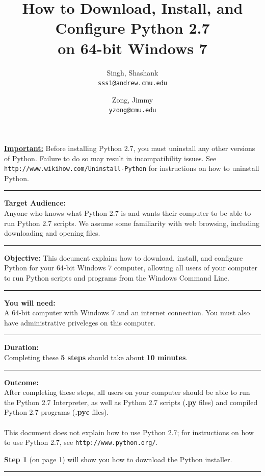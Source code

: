 \documentclass[11pt,english]{article}
\title{How to Download, Install, and Configure Python 2.7\\
on 64-bit Windows 7}
\author{
  Singh, Shashank \\
  \texttt{sss1@andrew.cmu.edu}
  \and
  Zong, Jimmy\\
  \texttt{yzong@cmu.edu}
}
\newcommand{\myhrule}{\vspace{0.3cm}\hrule\vspace{0.3cm}}
\begin{document}
\begin{titlepage}
\maketitle
\vfill
{\bf \color{red} \underline{Important:}} Before installing Python 2.7, you must
uninstall any other versions of Python. Failure to do so may result in
incompatibility issues. See \texttt{http://www.wikihow.com/Uninstall-Python}
for instructions on how to uninstall Python.
\myhrule
{\bf Target Audience:}\\
Anyone who knows what Python 2.7 is and wants their computer to be able to run
Python 2.7 scripts. We assume some familiarity with web browsing, including
downloading and opening files.
\myhrule
{\bf Objective:} This document explains how to download, install, and
configure Python for your 64-bit Windows 7 computer, allowing all users of your
computer to run Python scripts and programs from the Windows Command Line.
\myhrule
{\bf You will need:}\\
A 64-bit computer with Windows 7 and an internet connection. You must also have
administrative priveleges on this computer.
\myhrule
{\bf Duration:}\\
Completing these {\bf 5 steps} should take about {\bf 10 minutes}.
\myhrule
{\bf Outcome:}\\
After completing these steps, all users on your computer should be able to run
the Python 2.7 Interpreter, as well as Python 2.7 scripts ({\bf .py} files) and
compiled Python 2.7 programs ({\bf .pyc} files).\\\\
This document does not explain how to use Python 2.7; for instructions on how
to use Python 2.7, see \texttt{http://www.python.org/}.
\vspace{2cm}

{\bf Step 1} (on page 1) will show you how to download the Python
installer.
\myhrule
\end{titlepage}
\end{document}
